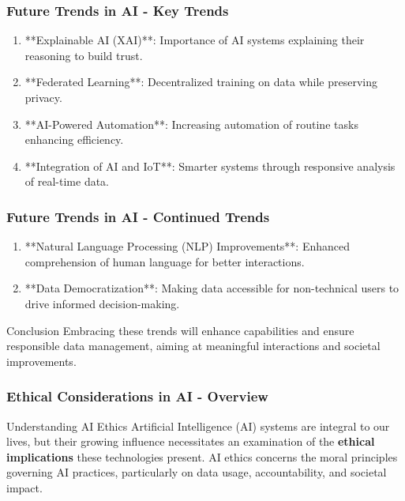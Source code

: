 \documentclass[aspectratio=169]{beamer}
\begin{document}
\begin{frame}[fragile]
    \frametitle{Future Trends in AI - Key Trends}
    \begin{enumerate}
        \item **Explainable AI (XAI)**: Importance of AI systems explaining their reasoning to build trust.
        \item **Federated Learning**: Decentralized training on data while preserving privacy.
        \item **AI-Powered Automation**: Increasing automation of routine tasks enhancing efficiency.
        \item **Integration of AI and IoT**: Smarter systems through responsive analysis of real-time data.
    \end{enumerate}
\end{frame}

\begin{frame}[fragile]
    \frametitle{Future Trends in AI - Continued Trends}
    \begin{enumerate}[resume]
        \item **Natural Language Processing (NLP) Improvements**: Enhanced comprehension of human language for better interactions.
        \item **Data Democratization**: Making data accessible for non-technical users to drive informed decision-making.
    \end{enumerate}
    
    \begin{block}{Conclusion}
        Embracing these trends will enhance capabilities and ensure responsible data management, aiming at meaningful interactions and societal improvements.
    \end{block}
\end{frame}

\begin{frame}[fragile]
    \frametitle{Ethical Considerations in AI - Overview}
    \begin{block}{Understanding AI Ethics}
        Artificial Intelligence (AI) systems are integral to our lives, but their growing influence necessitates an examination of the \textbf{ethical implications} these technologies present. AI ethics concerns the moral principles governing AI practices, particularly on data usage, accountability, and societal impact.
    \end{block}
\end{frame}
\end{document}
